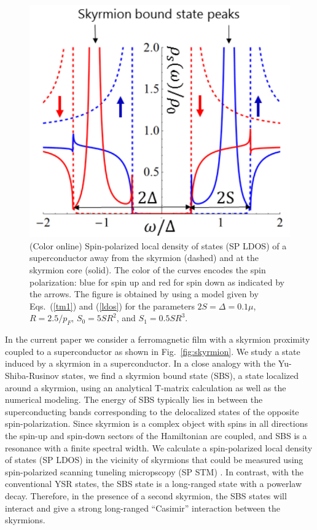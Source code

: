 \documentclass[twocolumn,showpacs,floatfix,longbibliography]{revtex4-1}
\begin{document}
\begin{figure} \centering
	\includegraphics[width=0.7\linewidth]{fig2} 
	\caption{(Color online) Spin-polarized local density of states (SP LDOS) of a superconductor away from the skyrmion (dashed) and at the skyrmion core (solid). The color of the curves encodes the spin polarization: blue for spin up and red for spin down as indicated by the arrows. The figure is obtained by using a model given by Eqs.~(\ref{tm1}) and (\ref{ldos}) for the parameters $2S = \Delta = 0.1 \mu$, $R = 2.5/p_F$, $S_0 = 5SR^2$, and $S_1 = 0.5 SR^3$.} \label{fig:LDOS}
\end{figure}


In the current paper we consider a ferromagnetic film with a skyrmion proximity coupled to a superconductor as shown in Fig.~\ref{fig:skyrmion}. We study a state induced by a skyrmion in a superconductor. In a close analogy with the Yu-Shiba-Rusinov \cite{Yu,Shiba,Rusinov,Balatsky2006} states, we find a skyrmion bound state (SBS), a state localized around a skyrmion, using an analytical T-matrix calculation as well as the numerical modeling. The energy of SBS typically lies in between the superconducting bands corresponding to the delocalized states of the opposite spin-polarization. Since skyrmion is a complex object with spins in all directions the spin-up and spin-down sectors of the Hamiltonian are coupled, and SBS is a resonance with a finite spectral width. We calculate a spin-polarized local density of states (SP LDOS) in the vicinity of skyrmions that could be measured using spin-polarized scanning tuneling micropscopy (SP STM) \cite{Romming2013,Bergmann2014,Romming2015}.  In contrast, with the conventional YSR states, the SBS state is a long-ranged state with a powerlaw decay. Therefore, in the presence of a second skyrmion, the SBS states will interact and give a strong \cite{Yao2014} long-ranged ``Casimir'' interaction \cite{Shytov2009} between the skyrmions.
\end{document}
